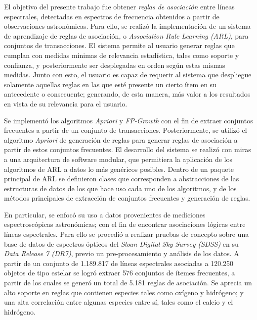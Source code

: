 \begin{conclusion}


El objetivo del presente trabajo fue obtener \textit{reglas de asociación} entre líneas espectrales, detectadas en espectros de frecuencia obtenidos a partir de observaciones astronómicas. Para ello, se realizó la implementación de un sistema de aprendizaje de reglas de asociación, o \textit{Association Rule Learning (ARL)}, para conjuntos de transacciones. El sistema permite al usuario generar reglas que cumplan con medidas mínimas de relevancia estadística, tales como soporte y confianza, y posteriormente ser desplegadas en orden según estas mismas medidas. Junto con esto, el usuario es capaz de requerir al sistema que despliegue solamente aquellas reglas en las que esté presente un cierto ítem en su antecedente o consecuente; generando, de esta manera, más valor a los resultados en vista de su relevancia para el usuario.

Se implementó los algoritmos \textit{Apriori} y \textit{FP-Growth} con el fin de extraer conjuntos frecuentes a partir de un conjunto de transacciones. Posteriormente, se utilizó el algoritmo \textit{Apriori} de generación de reglas para generar reglas de asociación a partir de estos conjuntos frecuentes. El desarrollo del sistema se realizó con miras a una arquitectura de software modular, que permitiera la aplicación de los algoritmos de ARL a datos lo más genéricos posibles. Dentro de un paquete principal de ARL se definieron clases que corresponden a abstracciones de las estructuras de datos de los que hace uso cada uno de los algoritmos, y de los métodos principales de extracción de conjuntos frecuentes y generación de reglas.

En particular, se enfocó su uso a datos provenientes de mediciones espectroscópicas astronómicas; con el fin de encontrar asociaciones lógicas entre líneas espectrales. Para ello se procedió a realizar pruebas de concepto sobre una base de datos de espectros ópticos del \textit{Sloan Digital Sky Survey (SDSS)} en su \textit{Data Release 7 (DR7)}, previo un pre-procesamiento y análisis de los datos. A partir de un conjunto de 1.189.817 de líneas espectrales asociadas a 120.250 objetos de tipo estelar se logró extraer 576 conjuntos de ítemes frecuentes, a partir de los cuales se generó un total de 5.181 reglas de asociación. Se aprecia un alto soporte en reglas que contienen especies tales como oxígeno y hidrógeno; y una alta correlación entre algunas especies entre sí, tales como el calcio y el hidrógeno.


\end{conclusion}
